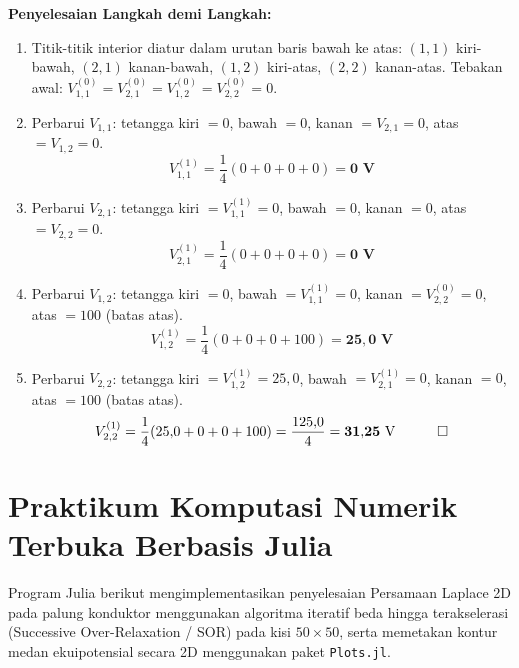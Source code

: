 \documentclass[11pt,a4paper]{article}
\theoremstyle{definition}
\begin{document}
\noindent\textbf{Penyelesaian Langkah demi Langkah:}
\begin{enumerate}[leftmargin=*]
    \item Titik-titik interior diatur dalam urutan baris bawah ke atas:
    $(1,1)$ kiri-bawah, $(2,1)$ kanan-bawah, $(1,2)$ kiri-atas, $(2,2)$ kanan-atas.
    Tebakan awal: $V_{1,1}^{(0)} = V_{2,1}^{(0)} = V_{1,2}^{(0)} = V_{2,2}^{(0)} = 0$.
    \item Perbarui $V_{1,1}$: tetangga kiri $= 0$, bawah $= 0$, kanan $= V_{2,1}=0$, atas $= V_{1,2}=0$.
    \begin{equation*}
        V_{1,1}^{(1)} = \frac{1}{4}(0 + 0 + 0 + 0) = \mathbf{0\text{ V}}
    \end{equation*}
    \item Perbarui $V_{2,1}$: tetangga kiri $= V_{1,1}^{(1)}=0$, bawah $= 0$, kanan $= 0$, atas $= V_{2,2}=0$.
    \begin{equation*}
        V_{2,1}^{(1)} = \frac{1}{4}(0 + 0 + 0 + 0) = \mathbf{0\text{ V}}
    \end{equation*}
    \item Perbarui $V_{1,2}$: tetangga kiri $= 0$, bawah $= V_{1,1}^{(1)}=0$, kanan $= V_{2,2}^{(0)}=0$, atas $= 100$ (batas atas).
    \begin{equation*}
        V_{1,2}^{(1)} = \frac{1}{4}(0 + 0 + 0 + 100) = \mathbf{25{,}0\text{ V}}
    \end{equation*}
    \item Perbarui $V_{2,2}$: tetangga kiri $= V_{1,2}^{(1)}=25{,}0$, bawah $= V_{2,1}^{(1)}=0$, kanan $= 0$, atas $= 100$ (batas atas).
    \begin{equation*}
        V_{2,2}^{(1)} = \frac{1}{4}(25{,}0 + 0 + 0 + 100) = \frac{125{,}0}{4} = \mathbf{31{,}25\text{ V}} \quad \qed
    \end{equation*}
\end{enumerate}

\section{Praktikum Komputasi Numerik Terbuka Berbasis Julia}

Program Julia berikut mengimplementasikan penyelesaian Persamaan Laplace 2D pada palung konduktor menggunakan algoritma iteratif beda hingga terakselerasi (Successive Over-Relaxation / SOR) pada kisi $50 \times 50$, serta memetakan kontur medan ekuipotensial secara 2D menggunakan paket \texttt{Plots.jl}.
\end{document}
